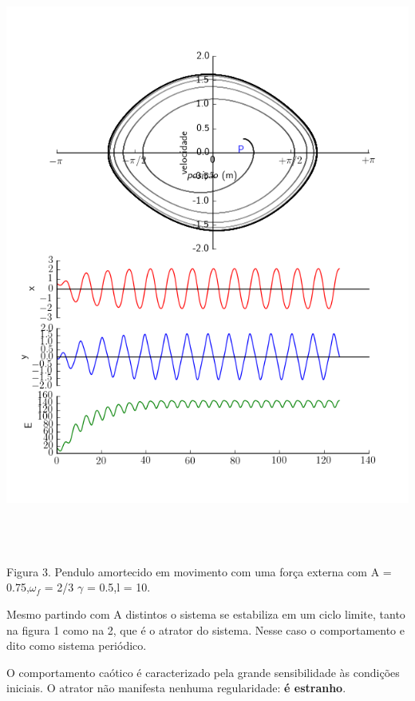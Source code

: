 \documentclass[dvipsnames,a4paper,11pt]{article}
\begin{document}
\begin{center}
	\includegraphics[width=6.24in,height=7.68in,keepaspectratio = false]{image2.png}
	
	\scriptsize Figura 3. Pendulo amortecido em movimento com uma força externa com A = 0.75,$\omega_f$ = 2/3 $\gamma$ = 0.5,l = 10. 
	
\end{center}

Mesmo partindo com A distintos o sistema se estabiliza em um ciclo limite, tanto na figura 1 como na 2, que é o atrator do sistema. Nesse caso o comportamento e dito como sistema periódico. 

O comportamento caótico é caracterizado pela grande sensibilidade às condições iniciais. O atrator não manifesta nenhuma regularidade:\textbf{ é estranho}.
\end{document}
